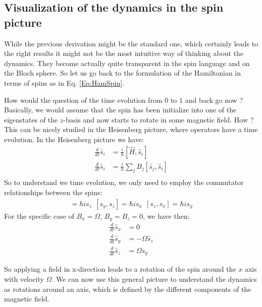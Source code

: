 \subsection{Visualization of the dynamics in the spin picture}

While the previous derivation might be the standard one, which certainly leads to the right results it might not be the most intuitive way of thinking about the dynamics. They become actually quite transparent in the spin language and on the Bloch sphere. So let us go back to the formulation of the Hamiltonian in terms of spins as in Eq. \eqref{Eq:HamSpin}.

How would the question of the time evolution from $0$ to $1$ and back go now ? Basically, we would assume that the spin has been initialize into one of the eigenstates of the $z$-basis and now starts to rotate in some magnetic field. How ? This can be nicely studied in the Heisenberg picture, where operators have a time evolution. In the Heisenberg picture we have:
\begin{align}
\frac{d}{dt} \hat{s}_i &= \frac{i}{\hbar}\left[\hat{H},\hat{s}_i\right]\\
\frac{d}{dt} \hat{s}_i &= \frac{i}{\hbar}\sum_j B_j \left[\hat{s}_j,\hat{s}_i\right]\\
 \end{align}
So to understand we time evolution, we only need to employ the commutator relationships between the spins:
\begin{align}
[ s_x, s_y] = \hbar is_z~~[ s_y, s_z] = \hbar is_x~~[ s_z, s_x] = \hbar is_y
\end{align}
For the specific case of $B_x=\Omega$, $B_y = B_z = 0$, we have then:
\begin{align}
\frac{d}{dt} \hat{s}_x &= 0\\
\frac{d}{dt} \hat{s}_y &= -\Omega \hat{s}_z\\
\frac{d}{dt} \hat{s}_z &= \Omega \hat{s}_y
 \end{align}
 
 So applying a field in x-direction leads to a rotation of the spin around the $x$ axis with velocity $\Omega$. We can now use this general picture to understand the dynamics as rotations around an axis, which is defined by the different components of the magnetic field.